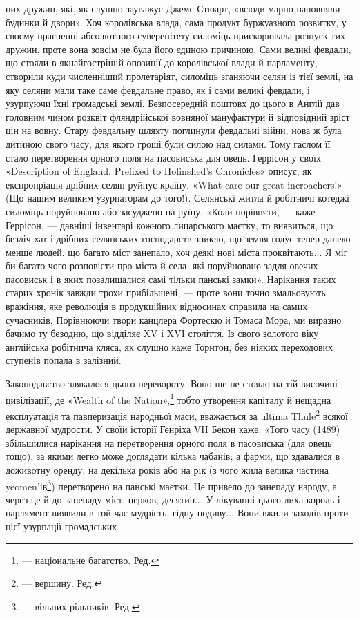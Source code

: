 них дружин, які, як слушно зауважує Джемс Стюарт, «всюди
марно наповняли будинки й двори». Хоч королівська влада,
сама продукт буржуазного розвитку, у своєму прагненні абсолютного
суверенітету силоміць прискорювала розпуск тих дружин,
проте вона зовсім не була його єдиною причиною. Сами
великі февдали, що стояли в якнайгострішій опозиції до королівської
влади й парламенту, створили куди численніший пролетаріят,
силоміць зганяючи селян із тієї землі, на яку селяни
мали таке саме февдальне право, як і сами великі февдали, і
узурпуючи їхні громадські землі. Безпосередній поштовх до цього
в Англії дав головним чином розквіт фляндрійської вовняної
мануфактури й відповідний зріст цін на вовну. Стару февдальну
шляхту поглинули февдальиі війни, нова ж була дитиною свого
часу, для якого гроші були силою над силами. Тому гаслом її
стало перетворення орного поля на пасовиська для овець. Геррісон
у своїх «Description of England. Prefixed to Holinshed’s
Chronicles» описує, як експропріація дрібних селян руйнує
країну. «What care our great incroachers!» (Що нашим великим
узурпаторам до того!). Селянські житла й робітничі котеджі
силоміць поруйновано або засуджено на руїну. «Коли порівняти, —
каже Геррісон, — давніші інвентарі кожного лицарського маєтку,
то виявиться, що безліч хат і дрібних селянських господарств
зникло, що земля годує тепер далеко менше людей, що багато
міст занепало, хоч деякі нові міста проквітають... Я міг би багато
чого розповісти про міста й села, які поруйновано задля
овечих пасовиськ і в яких позалишалися самі тільки панські
замки». Нарікання таких старих хронік завжди трохи прибільшені,
— проте вони точно змальовують вражіння, яке революція
в продукційних відносинах справила на самих сучасників.
Порівнюючи твори канцлера Фортескю й Томаса Мора, ми виразно
бачимо ту безодню, що відділяє XV і XVI століття. Із свого
золотого віку англійська робітнича кляса, як слушно каже Торнтон,
без ніяких переходових ступенів попала в залізний.

Законодавство злякалося цього перевороту. Воно ще не
стояло на тій височині цивілізації, де «Wealth of the Nation»,\footnote*{
— національне багатство. Ред.
}
тобто утворення капіталу й нещадна експлуатація та павперизація
народньої маси, вважається за ultima Thule\footnote*{
— вершину. Ред.
} всякої державної
мудрости. У своїй історії Генріха VII Бекон каже: «Того
часу (1489) збільшилися нарікання на перетворення орного поля
в пасовиська (для овець тощо), за якими легко може доглядати
кілька чабанів; а фарми, що здавалися в доживотну оренду, на декілька
років або на рік (з чого жила велика частина yeomen’ів\footnote*{
— вільних рільників. Ред.
})
перетворено на панські маєтки. Це привело до занепаду народу,
а через це й до занепаду міст, церков, десятин... У лікуванні
цього лиха король і парлямент виявили в той час мудрість, гідну
подиву... Вони вжили заходів проти цієї узурпації громадських